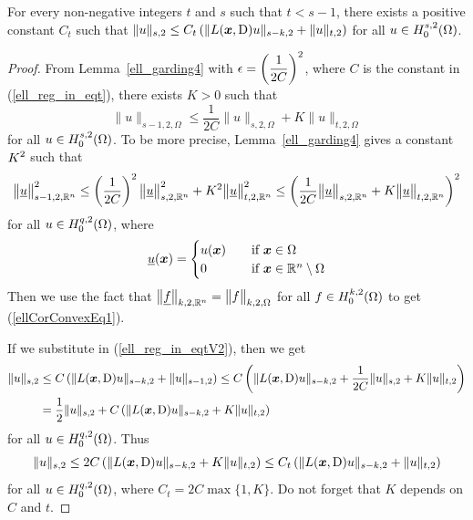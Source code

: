 \begin{cor} \label{ell_cor_convex}
For every non-negative integers $t$ and $s$ such that
$t<s-1$, there exists a positive constant $C_t$ such that
$\displaystyle \|u \|_{s,2} \leq C_t \left( \| L({\bm{x}},\operatorname{D}) u \|_{s-k,2}
+ \|u\|_{t,2} \right)$ for all $\displaystyle u \in H^{s,2}_0(\Omega)$.
\end{cor}

\begin{proof}
From Lemma~\ref{ell_garding4} with
$\displaystyle \epsilon = \left(\frac{1}{2C}\right)^2$, where $C$ is the
constant in (\ref{ell_reg_in_eqt}), there exists $K>0$ such that
\begin{equation} \label{ellCorConvexEq1}
\|u \|_{s-1,2,\Omega} \leq \frac{1}{2C} \| u \|_{s,2,\Omega} + K \|u\|_{t,2,\Omega}
\end{equation}
for all $\displaystyle u \in H^{s,2}_0(\Omega)$.
To be more precise, Lemma~\ref{ell_garding4} gives a constant
$\displaystyle K^2$ such that
\[
\big\|\underline{u} \big\|_{s-1,2,\mathbb{R}^n}^2 \leq
\left(\frac{1}{2C}\right)^2 \big\|\underline{u}\big\|_{s,2,\mathbb{R}^n}^2
+ K^2 \big\|\underline{u}\big\|_{t,2,\mathbb{R}^n}^2
\leq \left( \frac{1}{2C} \big\| \underline{u} \big\|_{s,2,\mathbb{R}^n}
+ K \big\|\underline{u}\big\|_{t,2,\mathbb{R}^n} \right)^2
\]
for all $\displaystyle u \in H^{q,2}_0(\Omega)$, where
\[
\underline{u}({\bm{x}}) = \begin{cases}
u({\bm{x}}) & \quad \text{if} \ {\bm{x}} \in \Omega \\
  0 & \quad \text{if} \ {\bm{x}} \in \mathbb{R}^n \setminus \Omega
\end{cases}
\]
Then we use the fact that
$\big\|\underline{f}\big\|_{k,2,\mathbb{R}^n} = \big\|f\big\|_{k,2,\Omega}$
for all $\displaystyle f \in H^{k,2}_0(\Omega)$
to get (\ref{ellCorConvexEq1}).

If we substitute in (\ref{ell_reg_in_eqtV2}), then we get
\begin{align*}
\|u \|_{s,2} &\leq C \left( \| L({\bm{x}},\operatorname{D})u \|_{s-k,2}
+ \|u\|_{s-1,2} \right)
\leq C \left( \| L({\bm{x}},\operatorname{D})u \|_{s-k,2} + \frac{1}{2C} \| u \|_{s,2} + K
\|u\|_{t,2} \right) \\
&= \frac{1}{2} \| u \|_{s,2} + C \left( \| L({\bm{x}},\operatorname{D})u \|_{s-k,2}
+ K \|u\|_{t,2} \right)
\end{align*}
for all $\displaystyle u \in H^{q,2}_0(\Omega)$.  Thus
\[
\|u \|_{s,2} \leq 2C \left( \| L({\bm{x}},\operatorname{D})u \|_{s-k,2} + K \|u\|_{t,2}
\right) \leq C_t \left( \| L({\bm{x}},\operatorname{D})u \|_{s-k,2} + \|u\|_{t,2} \right)
\]
for all $\displaystyle u \in H^{q,2}_0(\Omega)$,
where $C_t = 2C \max \{1, K \}$.  Do not forget that $K$ depends on
$C$ and $t$.
\end{proof}

